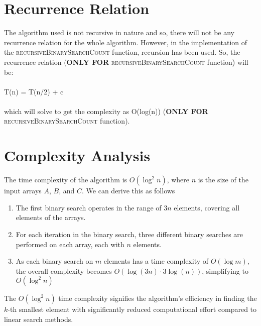 \documentclass{article}
\begin{document}
\section{Recurrence Relation}
The algorithm used is not recursive in nature and so, there will not be any recurrence relation for the whole algorithm. However, in the implementation of the \textsc{recursiveBinarySearchCount} function, recursion has been used. So, the recurrence relation (\textbf{ONLY FOR} \textsc{recursiveBinarySearchCount} function) will be:
\\\\ T(n) = T(n/2) + c \\\\
which will solve to get the complexity as O(log(n)) (\textbf{ONLY FOR} \textsc{recursiveBinarySearchCount} function).


\section{Complexity Analysis}
The time complexity of the algorithm is \(O(\log^2 n)\), where \(n\) is the size of the input arrays \(A\), \(B\), and \(C\). We can derive this as follows

\begin{enumerate}
    \item The first binary search operates in the range of \(3n\) elements, covering all elements of the arrays.
    \item For each iteration in the binary search, three different binary searches are performed on each array, each with \(n\) elements.
    \item As each binary search on \(m\) elements has a time complexity of \(O(\log m)\), the overall complexity becomes \(O(\log(3n) \cdot 3 \log(n))\), simplifying to \(O(\log^2 n)\)

\end{enumerate}
The \(O(\log^2 n)\) time complexity signifies the algorithm's efficiency in finding the \(k\)-th smallest element with significantly reduced computational effort compared to linear search methods.
\end{document}

